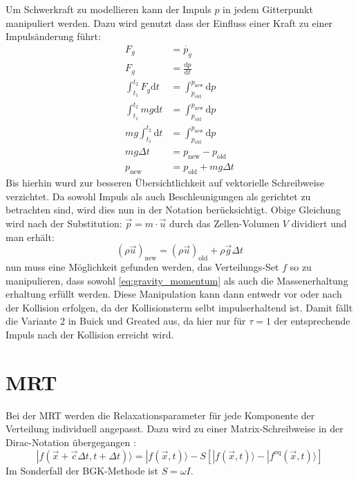 \documentclass[a4paper,10pt]{scrreprt}
\begin{document}
Um Schwerkraft zu modellieren kann der Impuls $p$ in jedem Gitterpunkt manipuliert werden. Dazu wird genutzt dass der Einfluss einer Kraft zu einer Impulsänderung führt:
\begin{align}
 F_g &= \dot{p_g} \\
 F_g &= \frac{\text{d} p}{\text{d} t} \\
\int_{t_1}^{t_2} F_g \text{d} t &= \int_{p_{\text{old}}}^{p_{\text{new}}} \text{d} p \\
\int_{t_1}^{t_2} m g \text{d} t &= \int_{p_{\text{old}}}^{p_{\text{new}}} \text{d} p \\
m g \int_{t_1}^{t_2} \text{d} t &= \int_{p_{\text{old}}}^{p_{\text{new}}} \text{d} p \\
m g \Delta t &= p_{\text{new}} - p_{\text{old}} \\
p_{\text{new}} &= p_{\text{old}} + m g \Delta t
\end{align}
Bis hierhin wurd zur besseren Übersichtlichkeit auf vektorielle Schreibweise verzichtet. Da sowohl Impuls als auch Beschleunigungen als gerichtet zu betrachten sind, wird dies nun in der Notation berücksichtigt.
Obige Gleichung wird nach der Substitution: $\vec{p} = m \cdot \vec{u}$  durch das Zellen-Volumen $V$ dividiert und man erhält:
\begin{equation}
\label{eq:gravity_momentum}
 (\rho \vec{u})_{\text{new}} = (\rho \vec{u})_{\text{old}} + \rho \vec{g} \Delta t
\end{equation}
nun muss eine Möglichkeit gefunden werden, das Verteilungs-Set $f$ so zu manipulieren, dass sowohl \eqref{eq:gravity_momentum} als auch die Massenerhaltung erhaltung erfüllt werden. Diese Manipulation kann dann entwedr vor oder nach der Kollision erfolgen, da der Kollisionsterm selbt impulserhaltend ist.
Damit fällt die Variante 2 in Buick und Greated \cite{Buick2000} aus, da hier nur für $\tau =1$ der entsprechende Impuls nach der Kollision erreicht wird.


\section{MRT}
Bei der MRT werden die Relaxationsparameter für jede Komponente der Verteilung individuell angepasst. Dazu wird zu einer Matrix-Schreibweise in der Dirac-Notation übergegangen \cite{2002}:
\begin{equation}
\label{eq:MRTbasic}
 | f(\vec{x} + \vec{c} \Delta t, t + \Delta t) \rangle = | f(\vec{x},t) \rangle - S [ | f(\vec{x},t) \rangle - | f^{\text{eq}}(\vec{x},t) \rangle]
\end{equation}
Im Sonderfall der BGK-Methode ist $S = \omega I$.
\end{document}
